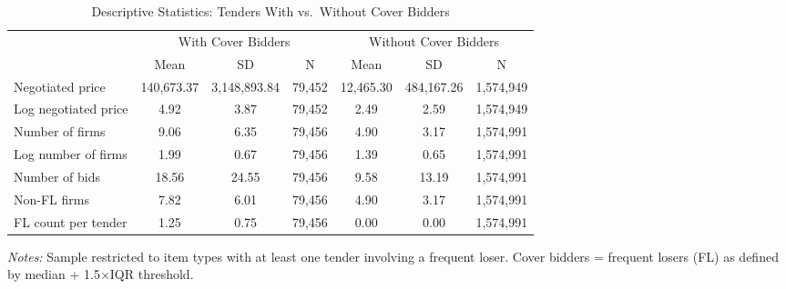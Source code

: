 \begin{table}[htbp]
\centering
\caption{Descriptive Statistics: Tenders With vs.\ Without Cover Bidders}
\label{tab:descstats}
\begin{adjustbox}{max width=\textwidth}
\begin{threeparttable}
\small
\begin{tabular}{lcccccc}
\toprule
 & \multicolumn{3}{c}{With Cover Bidders} & \multicolumn{3}{c}{Without Cover Bidders} \\
\cmidrule(lr){2-4} \cmidrule(lr){5-7}
 & Mean & SD & N & Mean & SD & N \\
\midrule
Negotiated price & 140,673.37 & 3,148,893.84 & 79,452 & 12,465.30 & 484,167.26 & 1,574,949 \\
Log negotiated price & 4.92 & 3.87 & 79,452 & 2.49 & 2.59 & 1,574,949 \\
Number of firms & 9.06 & 6.35 & 79,456 & 4.90 & 3.17 & 1,574,991 \\
Log number of firms & 1.99 & 0.67 & 79,456 & 1.39 & 0.65 & 1,574,991 \\
Number of bids & 18.56 & 24.55 & 79,456 & 9.58 & 13.19 & 1,574,991 \\
Non-FL firms & 7.82 & 6.01 & 79,456 & 4.90 & 3.17 & 1,574,991 \\
FL count per tender & 1.25 & 0.75 & 79,456 & 0.00 & 0.00 & 1,574,991 \\
\bottomrule
\end{tabular}
\begin{tablenotes}
\small
\item \textit{Notes:} Sample restricted to item types with at least one tender involving a frequent loser.
Cover bidders = frequent losers (FL) as defined by median + 1.5$\times$IQR threshold.
\end{tablenotes}
\end{threeparttable}
\end{adjustbox}
\end{table}
